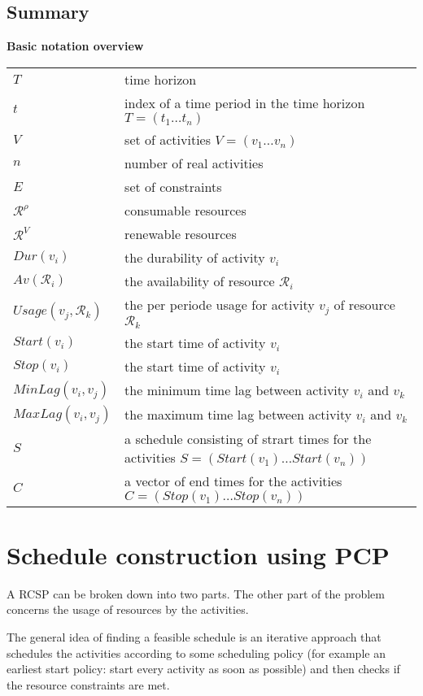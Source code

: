 \documentclass{article}
\newcommand{\leading}[1]{\textbf{#1}}
\begin{document}
\subsection{Summary}
\leading{Basic notation overview} \\
\begin{tabular}{l l}
\hline
$T$ & time horizon \\
$t$ & index of a time period in the time horizon $T = (t_1 \ldots t_n)$\\
$V$ & set of activities $V = (v_1 \ldots v_n)$ \\
$n$ & number of real activities \\
$E$ & set of constraints \\
$\mathcal{R}^{\rho}$ & consumable resources \\
$\mathcal{R}^V$ & renewable resources \\
$Dur(v_i)$ & the durability of activity $v_i$ \\
$Av(\mathcal{R}_i)$ & the availability of resource $\mathcal{R}_i$ \\
$Usage(v_j, \mathcal{R}_k)$ & the per periode usage for activity $v_j$ of resource $\mathcal{R}_k$ \\
$Start(v_i)$ & the start time of activity $v_i$ \\
$Stop(v_i)$ & the start time of activity $v_i$ \\
$MinLag(v_i, v_j)$ & the minimum time lag between activity $v_i$ and $v_k$ \\
$MaxLag(v_i, v_j)$ & the maximum time lag between activity $v_i$ and $v_k$ \\
$S$ & a schedule consisting of strart times for the activities $S = (Start(v_1) \ldots Start(v_n))$ \\
$C$ & a vector of end times for the activities $C = (Stop(v_1) \ldots Stop(v_n))$ \\
\hline
\end{tabular}

\newpage

\section{Schedule construction using PCP}
A RCSP can be broken down into two parts.  The other part of the problem concerns the usage of resources by the activities. 

The general idea of finding a feasible schedule is an iterative approach that schedules the activities according to some scheduling policy (for example an earliest start policy: start every activity as soon as possible) and then checks if the resource constraints are met. 
\end{document}
